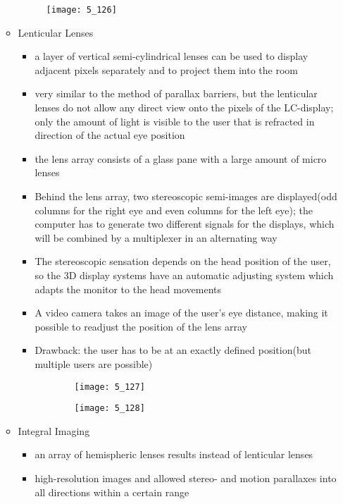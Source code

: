 \documentclass{standalone}
\begin{document}
\begin{itemize}
\begin{itemize}
				\begin{figure}[H]
					\texttt{[image: 5\_126]} 					
				\end{figure}

		\item Lenticular Lenses
			\begin{itemize}
				\item a layer of vertical semi-cylindrical lenses can be used to display adjacent pixels separately and to project them into the room
				\item very similar to the method of parallax barriers, but the lenticular lenses do not allow any direct view onto the pixels of the LC-display; only the amount of light is visible to the user that is refracted in direction of the actual eye position 
				\item the lens array consists of a glass pane with a large amount of micro lenses 
				\item Behind the lens array, two stereoscopic semi-images are displayed(odd columns for the right eye and even columns for the left eye); the computer has to generate two different signals for the displays, which will be combined by a multiplexer in an alternating way 
				\item The stereoscopic sensation depends on the head position of the user, so the 3D display systems have an automatic adjusting system which adapts the monitor to the head movements 
				\item A video camera takes an image of the user's eye distance, making it possible to readjust the position of the lens array
				\item Drawback: the user has to be at an exactly defined position(but multiple users are possible)
			\end{itemize} 

		\begin{figure}[H]
			\begin{subfigure}[b]{0.45\textwidth}
				\texttt{[image: 5\_127]} 
			\end{subfigure}
			\begin{subfigure}[b]{0.45\textwidth}
				\texttt{[image: 5\_128]}
			\end{subfigure}
		\end{figure}

		\item Integral Imaging
			\begin{itemize}
				\item an array of hemispheric lenses results instead of lenticular lenses 
				\item high-resolution images and allowed stereo- and motion parallaxes into all directions within a certain range
			\end{itemize}
			

\end{itemize}
\end{itemize}
\end{document}
